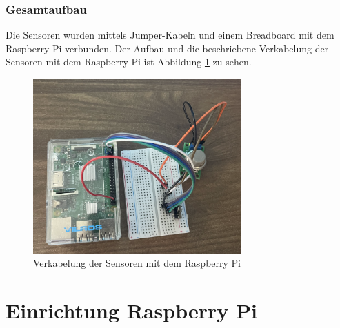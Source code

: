 \documentclass[conference]{IEEEtran}
\begin{document}
\subsubsection{Gesamtaufbau}
Die Sensoren wurden mittels Jumper-Kabeln und einem Breadboard mit dem Raspberry Pi verbunden. Der Aufbau und die beschriebene Verkabelung der Sensoren mit dem Raspberry Pi ist Abbildung \ref{aufbau} zu sehen.

\begin{figure}[htbp]
	\centerline{\includegraphics[width=80mm]{fig/aufbau.png}}
	\caption{Verkabelung der Sensoren mit dem Raspberry Pi}
	\label{aufbau}
\end{figure}

\section{Einrichtung Raspberry Pi}
\label{pi}
\end{document}
